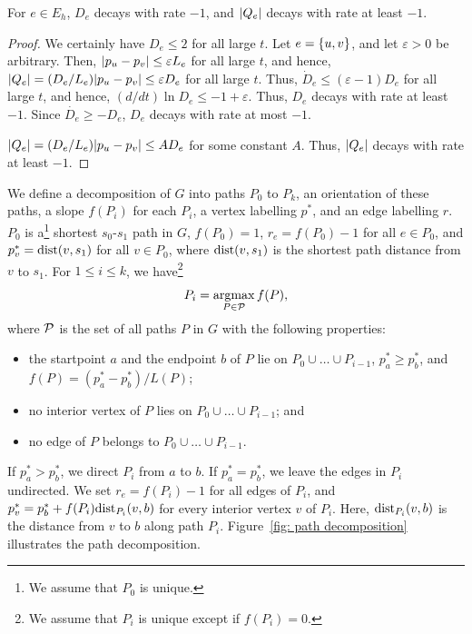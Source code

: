 \documentclass[11pt,a4paper]{article}
\renewcommand{\source}{\ensuremath{s_0}}
\renewcommand{\sink}{\ensuremath{s_1}}
\begin{document}
\begin{lemma}\label{lem: decay for Eh} For $e \in E_h$, $D_e$ decays with rate
$- 1$, and $| Q_e |$ decays with rate at least $-1$. \end{lemma}
\begin{proof} We certainly have $D_e \le 2$ for all large $t$. Let $e = \{ u,v \}$,
and let $\varepsilon > 0$ be arbitrary. 
Then, $| p_u - p_v | \le \varepsilon L_e$ for all large $t$, and hence, $| Q_e | = (D_e/L_e)| p_u
- p_v | \le \varepsilon D_e$ for all large $t$. Thus, $\dot{D}_e \le (\varepsilon - 1)
D_e$ for all large $t$, and hence, $(d/dt) \ln D_e \le -1 + \varepsilon$. 
Thus, $D_e$ decays with rate at least $-1$. Since $\dot{D_e} \ge -D_e$, $D_e$
decays with rate at most $-1$. 

$| Q_e | = (D_e/L_e) | p_u - p_v | \le A D_e$ for some constant $A$. Thus, 
$| Q_e |$ decays with rate at least $-1$. 
\end{proof}



We define a decomposition of $G$ into paths $P_0$ to $P_k$, an orientation of
these paths, a slope $f(P_i)$ for each $P_i$, a vertex
labelling $p^*$, and an edge labelling $r$. 
$P_0$ is a\footnote{We assume that $P_0$ is unique.}
shortest $\source$-$\sink$ path in $G$, $f(P_0) = 1$, $r_e = f(P_0)-1$ for all $e \in P_0$,
and $p_v^* = \dist(v,\sink)$ for all $v \in P_0$, where $\dist(v,\sink)$ is the
shortest path distance from $v$ to $\sink$. 
For $1 \le i \le k$, we have\footnote{We assume that $P_i$ is unique except if $f(P_i) = 0$.}
\[   P_i = \mathop \mathrm{argmax}_{P \in \cal P} f(P), \]
where $\cal P$ is the set of all paths $P$ in $G$ with the following properties:
\begin{itemize}
\item[-] the startpoint $a$ and the endpoint $b$ of $P$ lie on $P_0 \cup \ldots \cup
P_{i-1}$, $p^*_a \ge p_b^*$, and $f(P) = (p_a^* - p_b^*)/L(P)$;
\item[-] no interior vertex of $P$ lies on $P_0 \cup \ldots \cup
P_{i-1}$; and
\item[-] no edge of $P$ belongs to $P_0 \cup \ldots \cup
P_{i-1}$.
\end{itemize}
If $p^*_a > p_b^*$, we direct $P_i$ from $a$ to $b$. If $p^*_a = p^*_b$, we
leave the edges in $P_i$ undirected. We set 
$r_e = f(P_i) - 1$ for all edges of $P_i$, and $p^*_v = p^*_b +
f(P_i)\mathrm{dist}_{P_i}(v,b)$  for every interior vertex $v$ of
$P_i$. Here, $\mathrm{dist}_{P_i}(v,b)$ is the distance from $v$ to $b$ along path $P_i$. 
Figure~\ref{fig: path decomposition} illustrates the path 
decomposition. 
\end{document}

